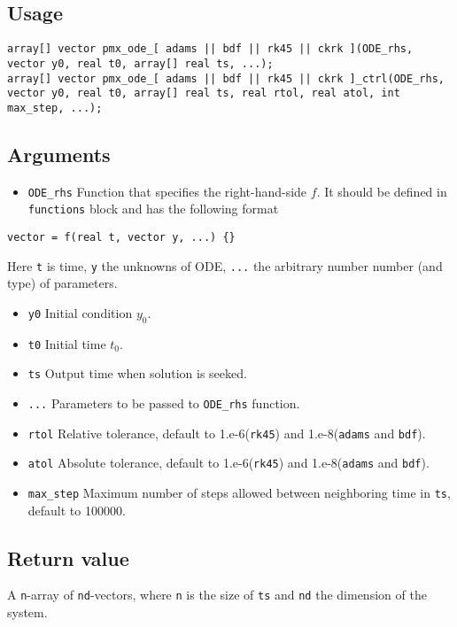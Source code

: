 \documentclass[12pt, reqno, oneside]{amsbook}
\numberwithin{equation}{chapter}
\numberwithin{figure}{chapter}
\numberwithin{table}{chapter}
\theoremstyle{remark}
\begin{document}
\subsection{Usage}
\label{sec:org13cb90b}
\begin{verbatim}
array[] vector pmx_ode_[ adams || bdf || rk45 || ckrk ](ODE_rhs, vector y0, real t0, array[] real ts, ...);
array[] vector pmx_ode_[ adams || bdf || rk45 || ckrk ]_ctrl(ODE_rhs, vector y0, real t0, array[] real ts, real rtol, real atol, int max_step, ...);
\end{verbatim}
\subsection{Arguments}
\label{sec:orgcf984ad}
\begin{itemize}
\item \texttt{ODE\_rhs}
Function that specifies the right-hand-side \(f\).
It should be defined in
\texttt{functions} block and has the following format
\end{itemize}
\begin{verbatim}
vector = f(real t, vector y, ...) {}
\end{verbatim}
Here \texttt{t} is time, \texttt{y} the unknowns of ODE, \texttt{...} the arbitrary number number (and type) of parameters.
\begin{itemize}
\item \texttt{y0}
Initial condition \(y_0\).
\item \texttt{t0}
Initial time \(t_0\).
\item \texttt{ts}
Output time when solution is seeked.
\item \texttt{...}
Parameters to be passed to \texttt{ODE\_rhs} function.
\item \texttt{rtol}
Relative tolerance, default to 1.e-6(\texttt{rk45}) and 1.e-8(\texttt{adams} and \texttt{bdf}).
\item \texttt{atol}
Absolute tolerance, default to 1.e-6(\texttt{rk45}) and 1.e-8(\texttt{adams} and \texttt{bdf}).
\item \texttt{max\_step}
Maximum number of steps allowed between neighboring time in \texttt{ts},
default to 100000.
\end{itemize}
\subsection{Return value}
\label{sec:org0bffd09}
A \texttt{n}-array of \texttt{nd}-vectors, where \texttt{n} is the size of \texttt{ts}
and \texttt{nd} the dimension of the system.
\end{document}
